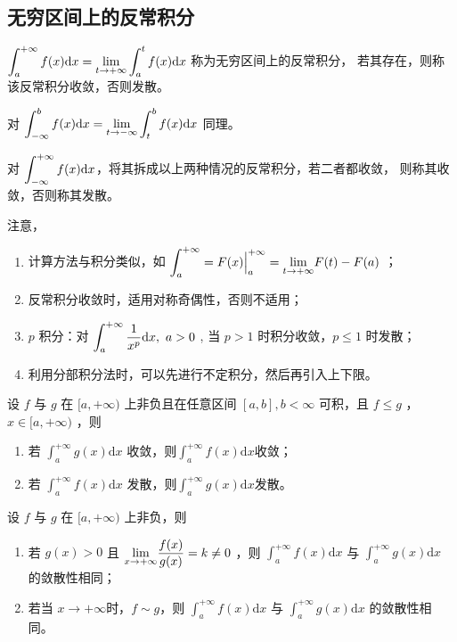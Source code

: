 \subsection{无穷区间上的反常积分}

$ \displaystyle \int_a^{+\infty}f(x)\mathrm{d}x = {\displaystyle\lim_{t\rightarrow +\infty}}
\int_a^t f(x)\mathrm{d}x $ 称为无穷区间上的反常积分，
若其存在，则称该反常积分收敛，否则发散。\vspace{3pt}

对 $ \displaystyle \int_{-\infty}^b f(x)\mathrm{d}x = {\displaystyle\lim_{t\rightarrow -\infty}}
\int_t^b f(x)\mathrm{d}x $ 同理。\vspace{3pt}

对 $ \displaystyle \int_{-\infty}^{+\infty}f(x)\mathrm{d}x $，将其拆成以上两种情况的反常积分，若二者都收敛，
则称其收敛，否则称其发散。

注意，
\begin{enumerate}
    \item 计算方法与积分类似，如 $\displaystyle \int_a^{+\infty} = F(x)\Big|^{+\infty}_a = 
    {\displaystyle\lim_{t\rightarrow +\infty}}F(t) - F(a) $ ；
    \item 反常积分收敛时，适用对称奇偶性，否则不适用；
    \item $ p $ 积分：对 $ \displaystyle \int_a^{+\infty}\dfrac{1}{x^p}\mathrm{d}x,\ a>0 $ ,
    当 $ p > 1 $ 时积分收敛，$ p\leq 1 $ 时发散；
    \item 利用分部积分法时，可以先进行不定积分，然后再引入上下限。
\end{enumerate}

\begin{Theo}[比较判别法]

    设 $ f $ 与 $ g $ 在 $ [a,+\infty) $ 上非负且在任意区间 $ [a,b],b<\infty $ 可积，且 $ f \leq g $ ，
    $ x\in[a,+\infty) $ ，则\begin{enumerate}
        \item 若 $ \int_a^{+\infty}g(x)\mathrm{d}x $ 收敛，则$ \int_a^{+\infty}f(x)\mathrm{d}x $收敛；
        \item 若 $ \int_a^{+\infty}f(x)\mathrm{d}x $ 发散，则$ \int_a^{+\infty}g(x)\mathrm{d}x $发散。
    \end{enumerate}
\end{Theo}

\begin{Theo}[比较判别法]

    设 $ f $ 与 $ g $ 在 $ [a,+\infty) $ 上非负，则
    \begin{enumerate}
        \item 若 $ g(x) > 0 $ 且 $ \displaystyle {\displaystyle\lim_{x\rightarrow +\infty}}
        \dfrac{f(x)}{g(x)} = k \neq 0 $ ，则 $ \int_a^{+\infty}f(x)\mathrm{d}x $ 与
        $ \int_a^{+\infty}g(x)\mathrm{d}x $ 的敛散性相同；
        \item 若当 $ x\rightarrow+\infty $时，$ f\sim g $，则 $ \int_a^{+\infty}f(x)\mathrm{d}x $ 与
        $ \int_a^{+\infty}g(x)\mathrm{d}x $ 的敛散性相同。
    \end{enumerate}
\end{Theo}

